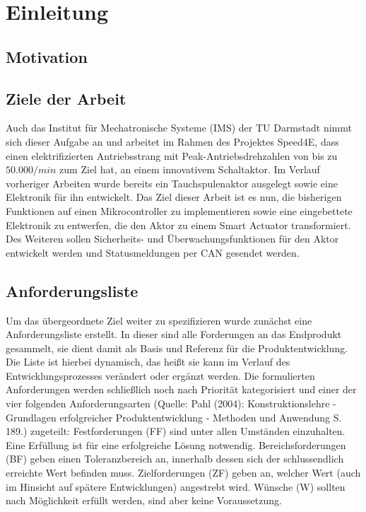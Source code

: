 \chapter{Einleitung}
\section{Motivation}

\section{Ziele der Arbeit}
Auch das Institut für Mechatronische Systeme (IMS) der TU Darmstadt nimmt sich dieser Aufgabe an und arbeitet im Rahmen des Projektes Speed4E, dass einen elektrifizierten Antriebsstrang mit Peak-Antriebsdrehzahlen von bis zu $50.000/min$ zum Ziel hat, an einem innovativem Schaltaktor. Im Verlauf vorheriger Arbeiten wurde bereits ein Tauchspulenaktor ausgelegt sowie eine Elektronik für ihn entwickelt. Das Ziel dieser Arbeit ist es nun, die bisherigen Funktionen auf einen Mikrocontroller zu implementieren sowie eine eingebettete Elektronik zu entwerfen, die den Aktor zu einem Smart Actuator transformiert. Des Weiteren sollen Sicherheits- und Überwachungsfunktionen für den Aktor entwickelt werden und Statusmeldungen per CAN gesendet werden. 

\section{Anforderungsliste}
Um das übergeordnete Ziel weiter zu spezifizieren wurde zunächst  eine Anforderungsliste erstellt. In dieser sind alle Forderungen an das Endprodukt gesammelt, sie dient damit als Basis und Referenz für die Produktentwicklung. Die Liste ist hierbei dynamisch, das heißt sie kann im Verlauf des Entwicklungsprozesses verändert oder ergänzt werden.  Die formulierten Anforderungen werden schließlich noch nach Priorität kategorisiert und einer der vier folgenden Anforderungsarten (Quelle: Pahl (2004): Konstruktionslehre - Grundlagen erfolgreicher Produktentwicklung - Methoden und Anwendung S. 189.) zugeteilt:
Festforderungen (FF) sind unter allen Umständen einzuhalten. Eine Erfüllung ist für eine erfolgreiche Lösung notwendig.
Bereichsforderungen (BF) geben einen Toleranzbereich an, innerhalb dessen sich der schlussendlich erreichte Wert befinden muss.
Zielforderungen (ZF) geben an, welcher Wert (auch im Hinsicht auf spätere Entwicklungen) angestrebt wird.
Wünsche (W) sollten nach Möglichkeit erfüllt werden, sind aber keine Voraussetzung. 


